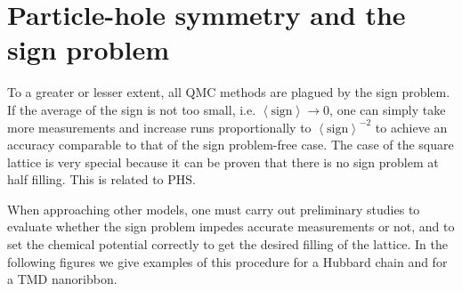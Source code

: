 \section{Particle-hole symmetry and the sign problem}\label{sec:phsSign}

To a greater or lesser extent, all \acl{QMC} methods are plagued by the sign problem.
If the average of the sign is not too small, i.e. $\left\langle \text{sign} \right\rangle \rightarrow 0$, one can simply take more measurements and increase runs proportionally to $\left\langle \text{sign} \right\rangle^{-2}$ to achieve an accuracy comparable to that of the sign problem-free case.
The case of the square lattice is very special because it can be proven that there is no sign problem at half filling.
This is related to \ac{PHS}.

When approaching other models, one must carry out preliminary studies to evaluate whether the sign problem impedes accurate measurements or not, and to set the chemical potential correctly to get the desired filling of the lattice.
In the following figures we give examples of this procedure for a Hubbard chain and for a \acs{TMD} nanoribbon.

